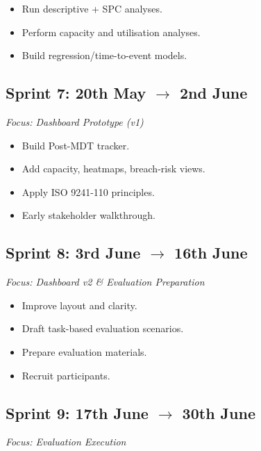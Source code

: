 \documentclass[12pt, a4paper, twoside]{article} %
\begin{document}
\begin{itemize}
  \item[$\square$] Run descriptive + SPC analyses.
  \item[$\square$] Perform capacity and utilisation analyses.
  \item[$\square$] Build regression/time-to-event models.
\end{itemize}


\subsection{Sprint 7: 20th May $\rightarrow$ 2nd June}
\emph{Focus: Dashboard Prototype (v1)}

\begin{itemize}
  \item[$\square$] Build Post-MDT tracker.
  \item[$\square$] Add capacity, heatmaps, breach-risk views.
  \item[$\square$] Apply ISO 9241-110 principles.
  \item[$\square$] Early stakeholder walkthrough.
\end{itemize}


\subsection{Sprint 8: 3rd June $\rightarrow$ 16th June}
\emph{Focus: Dashboard v2 \& Evaluation Preparation}

\begin{itemize}
  \item[$\square$] Improve layout and clarity.
  \item[$\square$] Draft task-based evaluation scenarios.
  \item[$\square$] Prepare evaluation materials.
  \item[$\square$] Recruit participants.
\end{itemize}


\subsection{Sprint 9: 17th June $\rightarrow$ 30th June}
\emph{Focus: Evaluation Execution}
\end{document}
